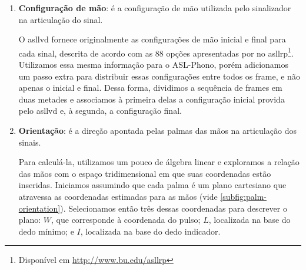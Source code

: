 \begin{enumerate}
    \item \textbf{Configuração de mão}: é a configuração de mão utilizada pelo sinalizador na articulação do sinal.

          O \acrshort{asllvd} fornece originalmente as configurações de mão inicial e final para cada sinal, descrita de acordo com as 88 opções apresentadas por  no \acrfull{asllrp}\footnote{
              Disponível em \url{http://www.bu.edu/asllrp}
          }.
          Utilizamos essa mesma informação para o ASL-Phono, porém adicionamos um passo extra para distribuir essas configurações entre todos os frame, e não apenas o inicial e final.
          Dessa forma, dividimos a sequência de frames em duas metades e associamos à primeira delas a configuração inicial provida pelo \acrshort{asllvd} e, à segunda, a configuração final.

    \item \textbf{Orientação}: é a direção apontada pelas palmas das mãos na articulação dos sinais.

          Para calculá-la, utilizamos um pouco de álgebra linear e exploramos a relação das mãos com o espaço tridimensional em que suas coordenadas estão inseridas.
          Iniciamos assumindo que cada palma é um plano cartesiano que atravessa as coordenadas estimadas para as mãos (vide \autoref{subfig:palm-orientation}). Selecionamos então três dessas coordenadas para descrever o plano: \(W\), que corresponde à coordenada do pulso; \(L\), localizada na base do dedo mínimo; e \(I\), localizada na base do dedo indicador.


\end{enumerate}
